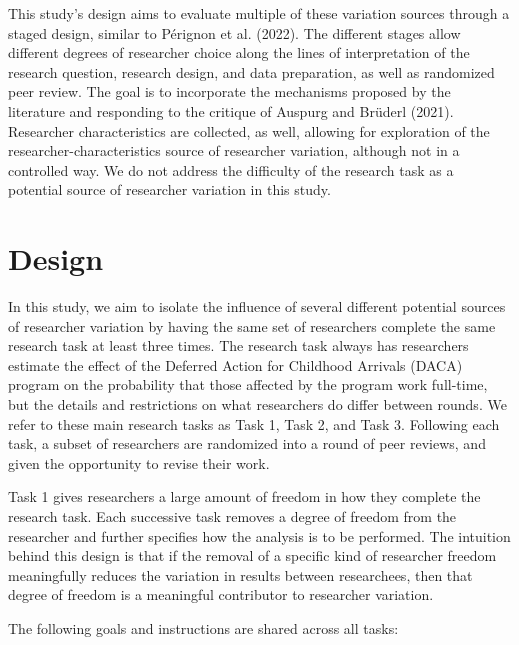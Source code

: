 \documentclass[
  letterpaper,
  DIV=11,
  numbers=noendperiod]{scrartcl}
\begin{document}
This study's design aims to evaluate multiple of these variation sources
through a staged design, similar to Pérignon et al. (2022). The
different stages allow different degrees of researcher choice along the
lines of interpretation of the research question, research design, and
data preparation, as well as randomized peer review. The goal is to
incorporate the mechanisms proposed by the literature and responding to
the critique of Auspurg and Brüderl (2021). Researcher characteristics
are collected, as well, allowing for exploration of the
researcher-characteristics source of researcher variation, although not
in a controlled way. We do not address the difficulty of the research
task as a potential source of researcher variation in this study.

\section{Design}\label{design}

In this study, we aim to isolate the influence of several different
potential sources of researcher variation by having the same set of
researchers complete the same research task at least three times. The
research task always has researchers estimate the effect of the Deferred
Action for Childhood Arrivals (DACA) program on the probability that
those affected by the program work full-time, but the details and
restrictions on what researchers do differ between rounds. We refer to
these main research tasks as Task 1, Task 2, and Task 3. Following each
task, a subset of researchers are randomized into a round of peer
reviews, and given the opportunity to revise their work.

Task 1 gives researchers a large amount of freedom in how they complete
the research task. Each successive task removes a degree of freedom from
the researcher and further specifies how the analysis is to be
performed. The intuition behind this design is that if the removal of a
specific kind of researcher freedom meaningfully reduces the variation
in results between researchees, then that degree of freedom is a
meaningful contributor to researcher variation.

The following goals and instructions are shared across all tasks:
\end{document}
